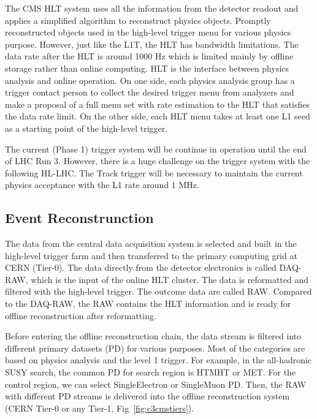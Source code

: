 The CMS HLT system uses all the information from the detector readout and applies a simplified algorithm to reconstruct physics objects. Promptly reconstructed objects used in the high-level trigger menu for various physics purpose. However, just like the L1T, the HLT has bandwidth limitations. The data rate after the HLT is around 1000 Hz which is limited mainly by offline storage rather than online computing. HLT is the interface between physics analysis and online operation. On one side, each physics analysis group has a trigger contact person to collect the desired trigger menu from analyzers and make a proposal of a full menu set with rate estimation to the HLT that satisfies the data rate limit. On the other side, each HLT menu takes at least one L1 seed as a starting point of the high-level trigger.

The current (Phase 1) trigger system will be continue in operation until the end of LHC Run 3. However, there is a huge challenge on the trigger system with the following HL-LHC. The Track trigger will be necessary to maintain the current physics acceptance with the L1 rate around 1 MHz. 

\clearpage
\subsection{Event Reconstrunction}

The data from the central data acquisition system is selected and built in the high-level trigger farm and then transferred to the primary computing grid at CERN (Tier-0). The data directly from the detector electronics is called DAQ-RAW, which is the input of the online HLT cluster. The data is reformatted and filtered with the high-level trigger. The outcome data are called RAW. Compared to the DAQ-RAW, the RAW contains the HLT information and is ready for offline reconstruction after reformatting. 

Before entering the offline reconstruction chain, the data stream is filtered into different primary datasets (PD) for various purposes. Most of the categories are based on physics analysis and the level 1 trigger. For example, in the all-hadronic SUSY search, the common PD for search region is HTMHT or MET. For the control region, we can select SingleElectron or SingleMuon PD. Then, the RAW with different PD streams is delivered into the offline reconstruction system (CERN Tier-0 or any Tier-1, Fig~\ref{fig:c3cmstiers}). 

